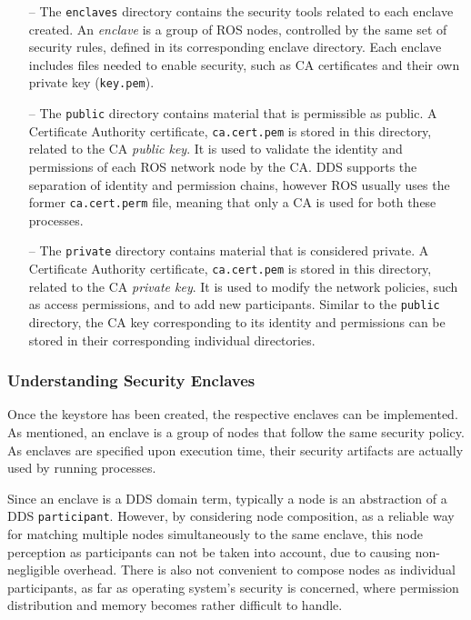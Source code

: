 \begin{itemize}
    \item[--] The \texttt{enclaves} directory contains the security tools related to each enclave created. An \textit{enclave} is a group of ROS nodes, controlled by the same set of security rules, defined in its corresponding enclave directory. Each enclave includes files needed to enable security, such as CA certificates and their own private key (\texttt{key.pem}). %
    \item[--] The \texttt{public} directory contains material that is permissible as public. A Certificate Authority certificate, \texttt{ca.cert.pem} is stored in this directory, related to the CA \textit{public key}. It is used to validate the identity and permissions of each ROS network node by the CA. DDS supports the separation of identity and permission chains, however ROS usually uses the former \texttt{ca.cert.perm} file, meaning that only a CA is used for both these processes.
    \item[--] The \texttt{private} directory contains material that is considered private. A Certificate Authority certificate, \texttt{ca.cert.pem} is stored in this directory, related to the CA \textit{private key}. It is used to modify the network policies, such as access permissions, and to add new participants. Similar to the \texttt{public} directory, the CA key corresponding to its identity and permissions can be stored in their corresponding individual directories.
\end{itemize}
            
\subsubsection{Understanding Security Enclaves}

Once the keystore has been created, the respective enclaves can be implemented. As mentioned, an enclave is a group of nodes that follow the same security policy. As enclaves are specified upon execution time, their security artifacts are actually used by running processes.

Since an enclave is a DDS domain term, typically a node is an abstraction of a DDS \texttt{participant}. However, by considering node composition, as a reliable way for matching multiple nodes simultaneously to the same enclave, this node perception as participants can not be taken into account, due to causing non-negligible overhead. There is also not convenient to compose nodes as individual participants, as far as operating system's security is concerned, where permission distribution and memory becomes rather difficult to handle.

